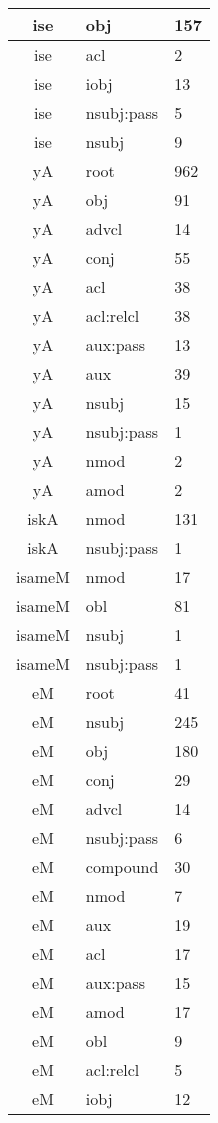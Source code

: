 \documentclass[a4 paper]{article}
\begin{document}
\begin{longtable}{cp{}p{}}
ise & obj & 157\\ \midrule ise & acl & 2\\ \midrule ise & iobj & 13\\ \midrule ise & nsubj:pass & 5\\ \midrule ise & nsubj & 9\\ \midrule 
yA & root & 962\\ \midrule yA & obj & 91\\ \midrule yA & advcl & 14\\ \midrule yA & conj & 55\\ \midrule yA & acl & 38\\ \midrule yA & acl:relcl & 38\\ \midrule yA & aux:pass & 13\\ \midrule yA & aux & 39\\ \midrule yA & nsubj & 15\\ \midrule yA & nsubj:pass & 1\\ \midrule yA & nmod & 2\\ \midrule yA & amod & 2\\ \midrule 
iskA & nmod & 131\\ \midrule iskA & nsubj:pass & 1\\ \midrule 
isameM & nmod & 17\\ \midrule isameM & obl & 81\\ \midrule isameM & nsubj & 1\\ \midrule isameM & nsubj:pass & 1\\ \midrule 
eM & root & 41\\ \midrule eM & nsubj & 245\\ \midrule eM & obj & 180\\ \midrule eM & conj & 29\\ \midrule eM & advcl & 14\\ \midrule eM & nsubj:pass & 6\\ \midrule eM & compound & 30\\ \midrule eM & nmod & 7\\ \midrule eM & aux & 19\\ \midrule eM & acl & 17\\ \midrule eM & aux:pass & 15\\ \midrule eM & amod & 17\\ \midrule eM & obl & 9\\ \midrule eM & acl:relcl & 5\\ \midrule eM & iobj & 12\\ \midrule 

\end{longtable}
\end{document}
